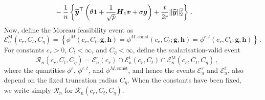 \documentclass{article}
\makeatletter
\theoremstyle{definition}
\newcommand{\vnorm}[1]{%
	\ensuremath{%
		\if@display
		\left\| #1 \right\|
		\else
		\| #1 \|
		\fi
	}%
}
\newcommand*{\bb}{\boldsymbol}
\def\bH {\bb{H}}
\def\bv{\bb{v}}
\def\bh{\bb{h}}
\def\bg{\bb{g}}
\def\bYtil{\widetilde{\bb{y}}}
\def\bH{\bb{H}}
\makeatother
\begin{document}
\begin{bibunit}
$$\begin{aligned}
	&
	-
	\frac1n
	\left\{
		\bYtil^\top
		\left(
			\theta\bb1+\frac1{\sqrt p}\bH_1\bv+\sigma\bg
		\right)
		+
		\frac{t}{2r}\vnorm{\bYtil}_2^2
	\right\} \,.
\end{aligned}
$$
Now, define the Moreau feasibility event as
$$
	\mathcal E_n^{\mathrm M}(c_r,C_t,C_\eta)
	=
	\left\{
		\phi^{M}(c_r,C_t;\bg,\bh)
		=
		\phi^{M,\mathrm{const}}(c_r,C_t;\bg,\bh) 
		= \phi^{r,t}(c_r,C_t;\bg,\bh)
	\right\} \,.
$$
For constants $c_r>0$, $C_t<\infty$, and $C_\eta<\infty$, define the
scalarisation-valid event
\begin{equation}
	\label{event:R_n}
	\mathcal R_n(c_r,C_t,C_\eta)
	=
	\mathcal E_n^r(c_r)
	\cap
	\mathcal E_n^t(c_r,C_t)
	\cap
	\mathcal E_n^{\mathrm M}(c_r,C_t,C_\eta) \,, 
\end{equation}
where the quantities $\phi^r$, $\phi^{r,t}$, and
$\phi^{M,\mathrm{const}}$, and hence the events
$\mathcal E_n^r$ and $\mathcal E_n^t$, also depend on the fixed truncation
radius $C_\eta$. 
When the constants have been fixed, we write simply
$\mathcal R_n$ for $\mathcal R_n(c_r,C_t,C_\eta)$.


\end{bibunit}
\end{document}

